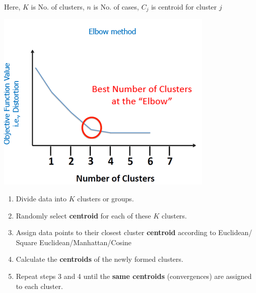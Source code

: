 \documentclass[letterpaper, 10.5pt,landscape]{article}
\begin{document}
\begin{multicols*}{3}
\vspace{-3pt}


Here, $K$ is No. of clusters, $n$ is No. of cases, $C_{j}$ is centroid for cluster $j$

\vspace{-10pt}
\begin{center}
    \begin{minipage}{0.6\linewidth}
    \includegraphics[width=\textwidth]{figures/K_means_clustering.PNG}
    \end{minipage}
\end{center}
\vspace{-5pt}




\begin{enumerate}
    \item Divide data into $K$ clusters or groups.
    \vspace{-3pt}
    \item Randomly select \textbf{centroid} for each of these $K$ clusters.
    \vspace{-3pt}
    \item Assign data points to their closest cluster
    \textbf{centroid} according to Euclidean/ Square Euclidean/Manhattan/Cosine
    \vspace{-3pt}
    \item Calculate the \textbf{centroids} of the newly formed clusters.
    \vspace{-3pt}
    \item Repeat steps 3 and 4 until the \textbf{same centroids} (convergences) are assigned to each cluster.
    \vspace{-3pt}
\end{enumerate}



\end{multicols*}
\end{document}
